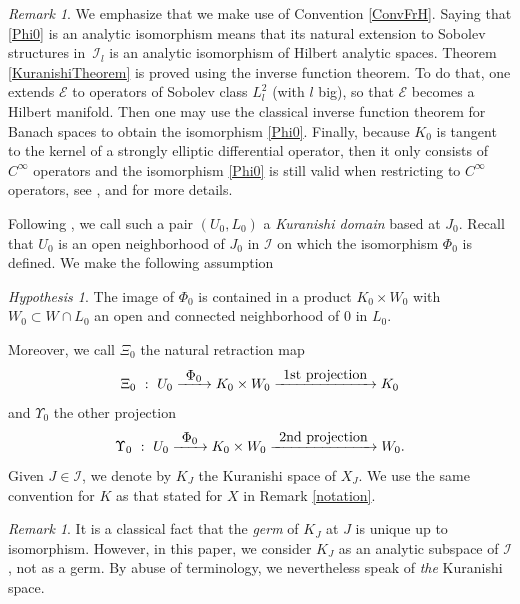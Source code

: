 \documentclass[JEP,XML,SOM,Unicode]{cedram}
\let\mathcal\mathscr
\def\To#1{\mathchoice{\xrightarrow{\textstyle\kern4pt#1\kern3pt}}{\stackrel{#1}{\longrightarrow}}{}{}}
\theoremstyle{plain}
\theoremstyle{definition}
\theoremstyle{remark}
\newtheorem{remark}[theorem]{Remark}
\newtheorem{hypothesis}[theorem]{Hypothesis}
\numberwithin{equation}{section}
\newcommand{\cI}{\mathcal{I}}
\begin{document}
\begin{remark}
\label{Sobolev}
We emphasize that we make use of Convention \ref{ConvFrH}. Saying that \eqref{Phi0} is an analytic isomorphism means that its natural extension to Sobolev structures in~$\cI_l$ is an analytic isomorphism of Hilbert analytic spaces.
Theorem \ref{KuranishiTheorem} is proved using the inverse function theorem. To do that, one extends $\mathcal E$ to operators of Sobolev class $L^2_l$ (with $l$ big), so that $\mathcal E$ becomes a Hilbert manifold. Then one may use the classical inverse function theorem for Banach spaces to obtain the isomorphism \eqref{Phi0}. Finally, because $K_0$ is tangent to the kernel of a strongly elliptic differential operator, then it only consists of $C^\infty$ operators and the isomorphism \eqref{Phi0} is still valid when restricting to $C^\infty$ operators, see \cite{Douady}, \cite{Kur1} and \cite{Ku3} for more details.
\end{remark}

Following \cite{circle}, we call such a pair $(U_0,L_0)$ a \emph{Kuranishi domain} based at $J_0$. Recall that $U_0$ is an open neighborhood of $J_0$ in $\cI$ on which the isomorphism $\Phi_0$ is defined. We make the following assumption
\begin{hypothesis}
\label{squarehyp}
The image of $\Phi_0$ is contained in a product $K_0\times W_0$ with $W_0\subset W\cap L_0$ an open and connected neighborhood of $0$ in $L_0$.
\end{hypothesis}
Moreover, we call $\Xi_0$ the natural retraction map
\begin{equation}
\label{Xi0}
\Xi_0\ :\ U_0\To{\Phi_0} K_0\times W_0 \To{\textup{1st projection}}K_0
\end{equation}
and $\Upsilon_0$ the other projection
\begin{equation}
\label{Up0}
\Upsilon_0\ :\ U_0\To{\Phi_0} K_0\times W_0 \To{\textup{2nd projection}}W_0.
\end{equation}
Given $J\in\cI$, we denote by $K_J$ the Kuranishi space of $X_J$. We use the same convention for $K$ as that stated for $X$ in Remark \ref{notation}.

\begin{remark}
\label{Kuniqueness}
It is a classical fact that the \emph{germ} of $K_J$ at $J$ is unique up to isomorphism. However, in this paper, we consider $K_J$ as an analytic subspace of $\cI$, not as a germ. By abuse of terminology, we nevertheless speak of \emph{the} Kuranishi space.
\end{remark}
\end{document}
